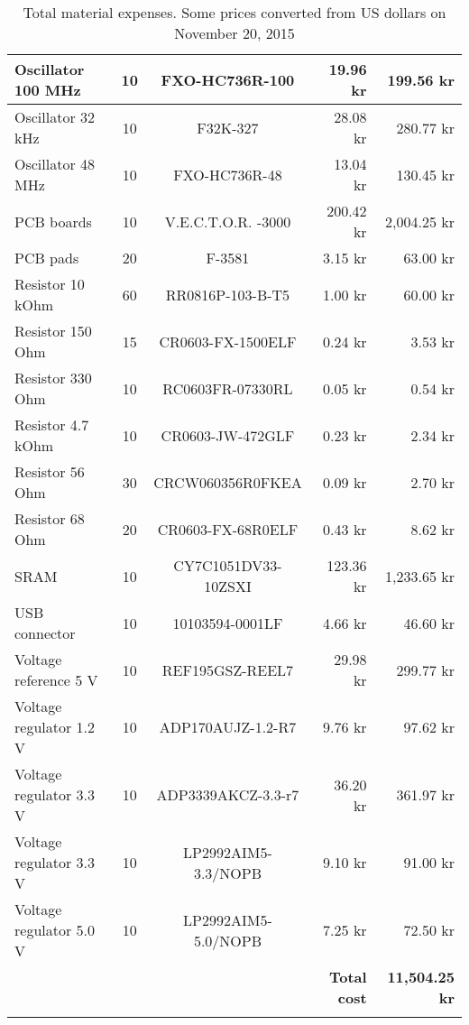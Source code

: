 \begin{longtable}{|l|c|c|r|r|}
    Oscillator 100 MHz      & 10    & FXO-HC736R-100	        & 19.96 kr   & 199.56 kr   \\ \hline
    Oscillator 32 kHz       & 10    & F32K-327	                & 28.08 kr   & 280.77 kr   \\ \hline
    Oscillator 48 MHz       & 10    & FXO-HC736R-48	            & 13.04 kr   & 130.45 kr   \\ \hline
    PCB boards              & 10    & V.E.C.T.O.R. -3000        & 200.42 kr  & 2,004.25 kr \\ \hline
    PCB pads                & 20    & F-3581                    & 3.15 kr    & 63.00 kr    \\ \hline
    Resistor 10 kOhm        & 60    & RR0816P-103-B-T5	        & 1.00 kr    & 60.00 kr    \\ \hline
    Resistor 150 Ohm        & 15    & CR0603-FX-1500ELF	        & 0.24 kr    & 3.53 kr     \\ \hline
    Resistor 330 Ohm        & 10    & RC0603FR-07330RL	        & 0.05 kr    & 0.54 kr     \\ \hline
    Resistor 4.7 kOhm       & 10    & CR0603-JW-472GLF	        & 0.23 kr    & 2.34 kr     \\ \hline
    Resistor 56 Ohm         & 30    & CRCW060356R0FKEA	        & 0.09 kr    & 2.70 kr     \\ \hline
    Resistor 68 Ohm         & 20    & CR0603-FX-68R0ELF	        & 0.43 kr    & 8.62 kr     \\ \hline
    SRAM                    & 10    & CY7C1051DV33-10ZSXI	    & 123.36 kr  & 1,233.65 kr \\ \hline
    USB connector           & 10    & 10103594-0001LF	        & 4.66 kr    & 46.60 kr    \\ \hline
    Voltage reference 5 V   & 10    & REF195GSZ-REEL7	        & 29.98 kr   & 299.77 kr   \\ \hline
    Voltage regulator 1.2 V & 10    & ADP170AUJZ-1.2-R7	        & 9.76 kr    & 97.62 kr    \\ \hline
    Voltage regulator 3.3 V & 10    & ADP3339AKCZ-3.3-r7	    & 36.20 kr   & 361.97 kr   \\ \hline
    Voltage regulator 3.3 V & 10    & LP2992AIM5-3.3/NOPB	    & 9.10 kr    & 91.00 kr    \\ \hline
    Voltage regulator 5.0 V & 10    & LP2992AIM5-5.0/NOPB	    & 7.25 kr    & 72.50 kr    \\ \hline \hline
    ~                       & ~     & ~   & \textbf{Total cost} & \textbf{11,504.25 kr}	   \\ \hline \hline
\caption{Total material expenses. Some prices converted from US dollars on November 20, 2015}
\end{longtable}
